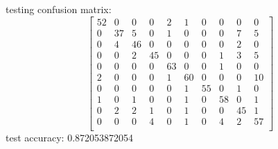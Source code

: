 \documentclass[12pt]{article}
\begin{document}
\begin{flushleft}
\vspace{1cm}
testing confusion matrix:
\[
\begin{bmatrix}
52  &0   &0   &0   &2   &1   &0   &0   &0   &0\\
0   &37  &5   &0   &1   &0   &0   &0   &7   &5\\
0   &4   &46  &0   &0   &0   &0   &0   &2   &0\\
0   &0   &2   &45  &0   &0   &0   &1   &3   &5\\
0   &0   &0   &0   &63  &0   &0   &1   &0   &0\\
2   &0   &0   &0   &1   &60  &0   &0   &0   &10\\
0   &0   &0   &0   &0   &1   &55  &0   &1   &0\\
1   &0   &1   &0   &0   &1   &0   &58  &0   &1\\
0   &2   &2   &1   &0   &1   &0   &0   &45  &1\\
0   &0   &0   &4   &0   &1   &0   &4   &2  &57\\
\end{bmatrix}
\]
test accuracy: 0.872053872054\\
		
	\end{flushleft}
\end{document}
